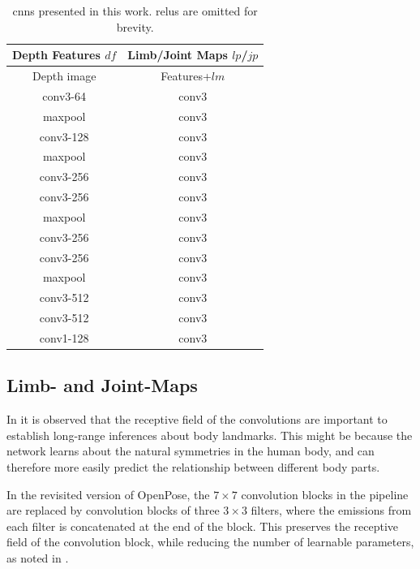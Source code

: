 \begin{table}
  \centering
  \begin{tabular}[h]{|c|c|}
    \hline
    Depth Features $df$ & Limb/Joint Maps $lp$/$jp$ \\
    \hline
    \hline
    Depth image & Features+$lm$ \\ \hline
    conv3-64 & conv3 \\ \hline
    maxpool & conv3 \\ \hline
    conv3-128 & conv3 \\ \hline
    maxpool & conv3 \\ \hline
    conv3-256 & conv3 \\ \hline
    conv3-256 & conv3 \\ \hline
    maxpool & conv3 \\ \hline
    conv3-256 & conv3 \\ \hline
    conv3-256 & conv3 \\ \hline
    maxpool & conv3 \\ \hline
    conv3-512 & conv3 \\ \hline
    conv3-512 & conv3 \\ \hline
    conv1-128 & conv3 \\ \hline
  \end{tabular}
  \caption{\gls{cnn}s presented in this work. \gls{relu}s are omitted for brevity.}
  \label{tab:cnns}
\end{table}

\subsection{Limb- and Joint-Maps}

In \cite{cao2019openpose,wei2016cpm} it is observed that the receptive field of the convolutions are important to establish long-range inferences about body landmarks. This might be because the network learns about the natural symmetries in the human body, and can therefore more easily predict the relationship between different body parts.

In the revisited version of OpenPose, the $7 \times 7$ convolution blocks in the pipeline are replaced by convolution blocks of three $3 \times 3$ filters, where the emissions from each filter is concatenated at the end of the block. This preserves the receptive field of the convolution block, while reducing the number of learnable parameters, as noted in \cite{simonyan2015deep}.

